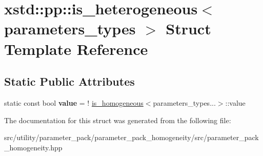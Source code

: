 \hypertarget{structxstd_1_1pp_1_1is__heterogeneous}{\section{xstd\-:\-:pp\-:\-:is\-\_\-heterogeneous$<$ parameters\-\_\-types $>$ Struct Template Reference}
\label{structxstd_1_1pp_1_1is__heterogeneous}
}
\subsection*{Static Public Attributes}
\begin{DoxyCompactItemize}
\item 
\hypertarget{structxstd_1_1pp_1_1is__heterogeneous_a790c8cb5a84cf3da91bf1602e181105b}{static const bool {\bfseries value} = ! \hyperlink{structxstd_1_1pp_1_1is__homogeneous}{is\-\_\-homogeneous}$<$parameters\-\_\-types...$>$\-::value}\label{structxstd_1_1pp_1_1is__heterogeneous_a790c8cb5a84cf3da91bf1602e181105b}

\end{DoxyCompactItemize}


The documentation for this struct was generated from the following file\-:\begin{DoxyCompactItemize}
\item 
src/utility/parameter\-\_\-pack/parameter\-\_\-pack\-\_\-homogeneity/src/parameter\-\_\-pack\-\_\-homogeneity.\-hpp\end{DoxyCompactItemize}
